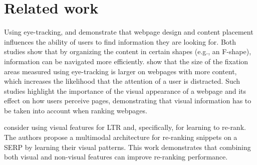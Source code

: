 
\section{Related work}
\label{sec:relatedwork}

%
%

Using eye-tracking, \citet{nielsen2006f} and \citet{pernice2017f} demonstrate that webpage design and content placement influences the ability of users to find information they are looking for. 
Both studies show that by organizing the content in certain shapes (e.g., an F-shape), information can be navigated more efficiently.
\citet{wang2014eye} show that the size of the fixation areas measured using eye-tracking is larger on webpages with more content, which increases the likelihood that the attention of a user is distracted.
Such studies highlight the importance of the visual appearance of a webpage and its effect on how users perceive pages, demonstrating that visual information has to be taken into account when ranking webpages.

\citet{zhang2018relevance} consider using visual features for \ac{LTR} and, specifically, for learning to re-rank.
The authors propose a multimodal architecture for re-ranking snippets on a \ac{SERP} by learning their visual patterns.
This work demonstrates that combining both visual and non-visual features can improve re-ranking performance.

